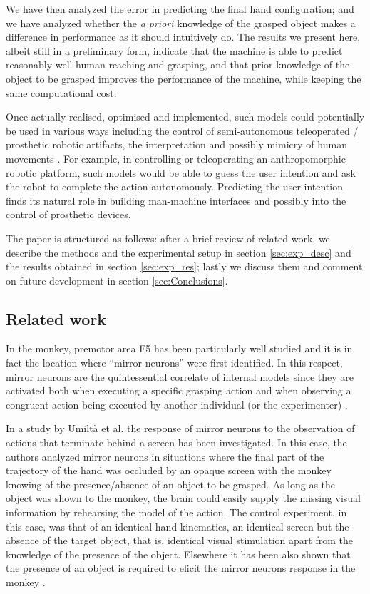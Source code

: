 We have then analyzed the error in predicting the final hand
configuration; and we have analyzed whether the \emph{a priori}
knowledge of the grasped object makes a difference in performance as
it should intuitively do. The results we present here, albeit still in
a preliminary form, indicate that the machine is able to predict
reasonably well human reaching and grasping, and that prior knowledge
of the object to be grasped improves the performance of the machine,
while keeping the same computational cost.

Once actually realised, optimised and implemented, such 
models could potentially be used in various ways including the control
of semi-autonomous teleoperated / prosthetic robotic artifacts, the
interpretation and possibly mimicry of human movements
\cite{wolpert-01}. For example, in controlling or teleoperating an
anthropomorphic robotic platform, such models would be able to guess
the user intention and ask the robot to complete the action
autonomously. Predicting the user intention finds its natural role in
building man-machine interfaces and possibly into the control of
prosthetic devices.

The paper is structured as follows: after a brief review of related
work, we describe the methods and the experimental setup in section
\ref{sec:exp_desc} and the results obtained in section
\ref{sec:exp_res}; lastly we discuss them and comment on future
development in section \ref{sec:Conclusions}.

\subsection{Related work}

In the monkey, premotor area F5 has been particularly well studied and
it is in fact the location where ``mirror neurons'' were first
identified. In this respect, mirror neurons are the quintessential
correlate of internal models since they are
activated both when executing a specific grasping action and when
observing a congruent action being executed by another individual (or
the experimenter) \cite{fadiga-00}.

In a study by Umilt\`a et al. \cite{umilta-01} the response of mirror
neurons to the observation of actions that terminate behind a screen
has been investigated. In this case, the authors analyzed mirror
neurons in situations where the final part of the trajectory of the hand was occluded
by an opaque screen with the monkey knowing of the presence/absence of
an object to be grasped. As long as the object was shown to the
monkey, the brain could easily supply the missing visual information
by rehearsing the model of the action. The control
experiment, in this case, was that of an identical hand kinematics, an
identical screen but the absence of the target object, that is,
identical visual stimulation apart from the knowledge of the presence
of the object. Elsewhere it has been also shown that the presence of
an object is required to elicit the mirror neurons response in the
monkey \cite{gallese-96}.

